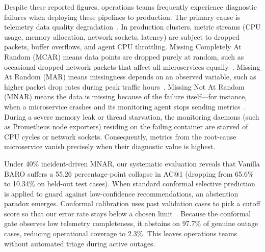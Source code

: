 \documentclass[conference]{IEEEtran}
\begin{document}
Despite these reported figures, operations teams frequently experience diagnostic failures when deploying these pipelines to production.
The primary cause is telemetry data quality degradation~\cite{wu2021current,liu2024tsbad}.
In production clusters, metric streams (CPU usage, memory allocation, network sockets, latency) are subject to dropped packets, buffer overflows, and agent CPU throttling.
Missing Completely At Random (MCAR) means data points are dropped purely at random, such as occasional dropped network packets that affect all microservices equally~\cite{rubin1976inference}.
Missing At Random (MAR) means missingness depends on an observed variable, such as higher packet drop rates during peak traffic hours~\cite{rubin1976inference}.
Missing Not At Random (MNAR) means the data is missing because of the failure itself---for instance, when a microservice crashes and its monitoring agent stops sending metrics~\cite{rubin1976inference}.
During a severe memory leak or thread starvation, the monitoring daemons (such as Prometheus node exporters) residing on the failing container are starved of CPU cycles or network sockets.
Consequently, metrics from the root-cause microservice vanish precisely when their diagnostic value is highest.

Under 40\% incident-driven MNAR, our systematic evaluation reveals that Vanilla BARO suffers a 55.26 percentage-point collapse in AC@1 (dropping from 65.6\% to 10.34\% on held-out test cases).
When standard conformal selective prediction~\cite{geifman2017selective,angelopoulos2021gentle} is applied to guard against low-confidence recommendations, an abstention paradox emerges.
Conformal calibration uses past validation cases to pick a cutoff score so that our error rate stays below a chosen limit~\cite{angelopoulos2021gentle}.
Because the conformal gate observes low telemetry completeness, it abstains on 97.7\% of genuine outage cases, reducing operational coverage to 2.3\%.
This leaves operations teams without automated triage during active outages.
\end{document}
